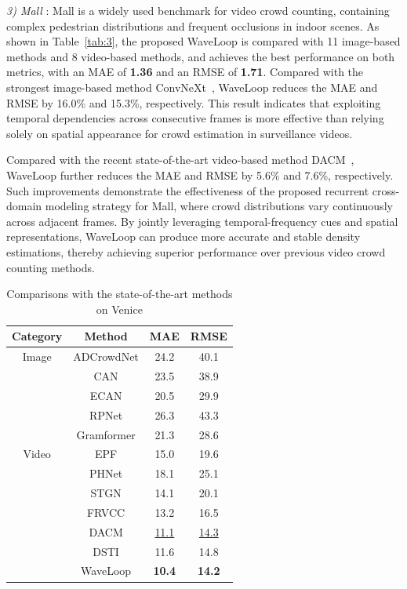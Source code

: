 \documentclass[lettersize,journal]{IEEEtran}
\begin{document}
\textit{3) Mall} \cite{chen2012feature}:
Mall is a widely used benchmark for video crowd counting, containing complex pedestrian distributions and frequent occlusions in indoor scenes. As shown in Table~\ref{tab:3}, the proposed WaveLoop is compared with 11 image-based methods and 8 video-based methods, and achieves the best performance on both metrics, with an MAE of \textbf{1.36} and an RMSE of \textbf{1.71}. Compared with the strongest image-based method ConvNeXt~\cite{liu2022convnet}, WaveLoop reduces the MAE and RMSE by 16.0\% and 15.3\%, respectively. This result indicates that exploiting temporal dependencies across consecutive frames is more effective than relying solely on spatial appearance for crowd estimation in surveillance videos.

Compared with the recent state-of-the-art video-based method DACM~\cite{ling2025dual}, WaveLoop further reduces the MAE and RMSE by 5.6\% and 7.6\%, respectively. Such improvements demonstrate the effectiveness of the proposed recurrent cross-domain modeling strategy for Mall, where crowd distributions vary continuously across adjacent frames. By jointly leveraging temporal-frequency cues and spatial representations, WaveLoop can produce more accurate and stable density estimations, thereby achieving superior performance over previous video crowd counting methods.



\begin{table}[h]
\caption{Comparisons with the state-of-the-art methods on Venice}
\centering
\scriptsize
\begin{tabular}{@{}cccc@{}}
\toprule
Category & Method & MAE & RMSE  \\ 
\midrule
Image & ADCrowdNet \cite{liu2019adcrowdnet} & 24.2 & 40.1 \\
& CAN \cite{liu2019context} & 23.5 & 38.9 \\
& ECAN \cite{liu2019context} & 20.5 & 29.9 \\
& RPNet \cite{yang2020reverse} & 26.3 & 43.3 \\
& Gramformer \cite{lin2024gramformer} & 21.3 & 28.6 \\
\midrule
Video & EPF \cite{liu2020estimating} & 15.0 & 19.6 \\
& PHNet \cite{meng2021phnet} & 18.1 & 25.1 \\
& STGN \cite{wu2022spatial} & 14.1 & 20.1 \\
& FRVCC \cite{hou2023frame}  & {13.2} & {16.5} \\
& DACM \cite{ling2025dual} & \underline{11.1} & \underline{14.3} \\
& DSTI \cite{ling2026dual} & 11.6 & 14.8 \\
& WaveLoop  & \textbf{10.4} & \textbf{14.2} \\
\bottomrule
\end{tabular}
\label{tab:4}
\vspace{-1em}
\end{table}
\end{document}
